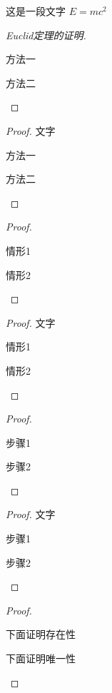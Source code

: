 \documentclass{ctexart}
\begin{document}
\begin{analysis}
  这是一段文字 $E = m c^2$
\end{analysis}

\begin{proof}[Euclid定理的证明]
  \begin{method}
    \item 方法一
    \item 方法二
  \end{method}
\end{proof}

\begin{proof}
  文字
  \begin{method}
    \item 方法一
    \item 方法二
  \end{method}
\end{proof}

\begin{proof}
  \begin{case}
    \item 情形1
    \item 情形2
  \end{case}
\end{proof}

\begin{proof}
  文字
  \begin{case}
    \item 情形1
    \item 情形2
  \end{case}
\end{proof}

\begin{proof}
  \begin{step}
    \item 步骤1
    \item 步骤2
  \end{step}
\end{proof}

\begin{proof}
  文字
  \begin{step}
    \item 步骤1
    \item 步骤2
  \end{step}
\end{proof}

\begin{proof}
  \begin{existence}
    下面证明存在性
  \end{existence}
  \begin{uniqueness}
    下面证明唯一性
  \end{uniqueness}
\end{proof}
\end{document}
